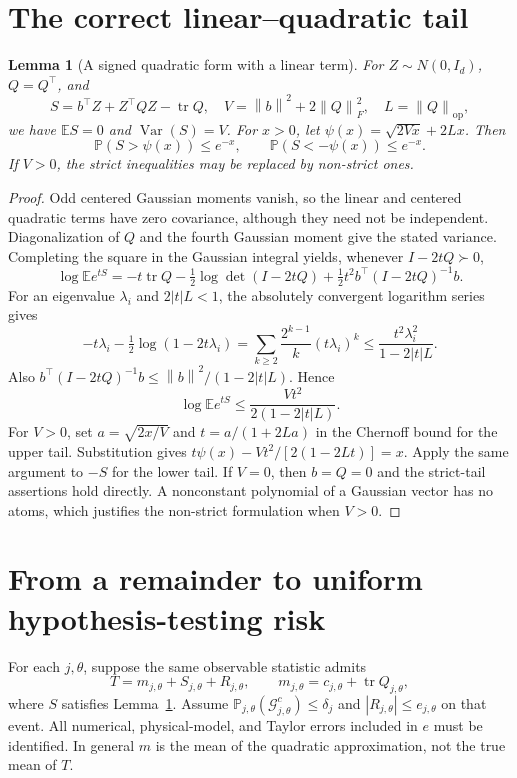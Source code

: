 \documentclass[11pt]{article}
\newtheorem{lemma}[theorem]{Lemma}
\theoremstyle{remark}\newtheorem{remark}[theorem]{Remark}
\newcommand{\E}{\mathbb E}
\newcommand{\Prob}{\mathbb P}
\newcommand{\norm}[1]{\left\lVert#1\right\rVert}
\newcommand{\tr}{\operatorname{tr}}
\newcommand{\op}{\mathrm{op}}
\begin{document}
\section{The correct linear--quadratic tail}
\begin{lemma}[A signed quadratic form with a linear term]\label{lem:tail}
For $Z\sim N(0,I_d)$, $Q=Q^\top$, and
\[
 S=b^\top Z+Z^\top QZ-\tr Q,\quad
 V=\norm b^2+2\norm Q_F^2,\quad L=\norm Q_\op,
\]
we have $\E S=0$ and $\operatorname{Var}(S)=V$. For $x>0$, let
$\psi(x)=\sqrt{2Vx}+2Lx$. Then
\begin{equation}\label{eq:tail}
 \Prob(S>\psi(x))\le e^{-x},\qquad
 \Prob(S<-\psi(x))\le e^{-x}.
\end{equation}
If $V>0$, the strict inequalities may be replaced by non-strict ones.
\end{lemma}

\begin{proof}
Odd centered Gaussian moments vanish, so the linear and centered quadratic terms have zero covariance, although they need not be independent. Diagonalization of $Q$ and the fourth Gaussian moment give the stated variance. Completing the square in the Gaussian integral yields, whenever $I-2tQ\succ0$,
\begin{equation}\label{eq:mgf}
 \log\E e^{tS}=-t\tr Q-\tfrac12\log\det(I-2tQ)
       +\tfrac12t^2 b^\top(I-2tQ)^{-1}b.
\end{equation}
For an eigenvalue $\lambda_i$ and $2|t|L<1$, the absolutely convergent logarithm series gives
\[
-t\lambda_i-\tfrac12\log(1-2t\lambda_i)
 =\sum_{k\ge2}\frac{2^{k-1}}{k}(t\lambda_i)^k
 \le\frac{t^2\lambda_i^2}{1-2|t|L}.
\]
Also $b^\top(I-2tQ)^{-1}b\le\norm b^2/(1-2|t|L)$. Hence
\begin{equation}\label{eq:subgamma}
 \log\E e^{tS}\le \frac{Vt^2}{2(1-2|t|L)}.
\end{equation}
For $V>0$, set $a=\sqrt{2x/V}$ and $t=a/(1+2La)$ in the Chernoff bound for the upper tail. Substitution gives
$t\psi(x)-Vt^2/[2(1-2Lt)]=x$. Apply the same argument to $-S$ for the lower tail. If $V=0$, then $b=Q=0$ and the strict-tail assertions hold directly. A nonconstant polynomial of a Gaussian vector has no atoms, which justifies the non-strict formulation when $V>0$.
\end{proof}

\section{From a remainder to uniform hypothesis-testing risk}
For each $j,\theta$, suppose the same observable statistic admits
\[
 T=m_{j,\theta}+S_{j,\theta}+R_{j,\theta},\qquad
 m_{j,\theta}=c_{j,\theta}+\tr Q_{j,\theta},
\]
where $S$ satisfies Lemma~\ref{lem:tail}. Assume
$\Prob_{j,\theta}(\mathcal G_{j,\theta}^c)\le\delta_j$ and
$|R_{j,\theta}|\le e_{j,\theta}$ on that event. All numerical, physical-model, and Taylor errors included in $e$ must be identified. In general $m$ is the mean of the quadratic approximation, not the true mean of $T$.
\end{document}
